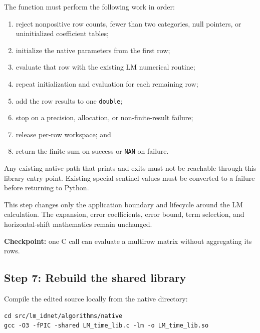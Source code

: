 \documentclass[11pt,a4paper]{article}
\begin{document}
The function must perform the following work in order:

\begin{enumerate}

\item reject nonpositive row counts, fewer than two categories, null pointers,
or uninitialized coefficient tables;

\item initialize the native parameters from the first row;

\item evaluate that row with the existing LM numerical routine;

\item repeat initialization and evaluation for each remaining row;

\item add the row results to one \texttt{double};

\item stop on a precision, allocation, or non-finite-result failure;

\item release per-row workspace; and

\item return the finite sum on success or \texttt{NAN} on failure.

\end{enumerate}

Any existing native path that prints and exits must not be reachable through
this library entry point. Existing special sentinel values must be converted
to a failure before returning to Python.

This step changes only the application boundary and lifecycle around the LM
calculation. The expansion, error coefficients, error bound, term selection,
and horizontal-shift mathematics remain unchanged.

\textbf{Checkpoint:} one C call can evaluate a multirow matrix without
aggregating its rows.

\subsection{Step 7: Rebuild the shared library}

Compile the edited source locally from the native directory:

\begin{verbatim}
cd src/lm_idnet/algorithms/native
gcc -O3 -fPIC -shared LM_time_lib.c -lm -o LM_time_lib.so
\end{verbatim}
\end{document}
